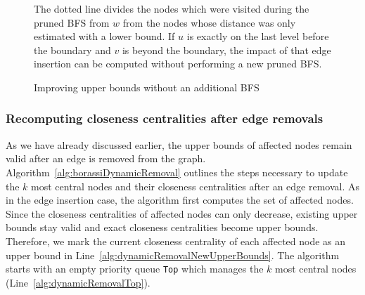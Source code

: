 \begin{figure}[h!]
\centering
{}
\caption{Improving upper bounds without an additional BFS}{The dotted line divides the nodes which were visited during the pruned BFS from $w$ from the nodes whose distance was only estimated with a lower bound. If $u$ is exactly on the last level before the boundary and $v$ is beyond the boundary, the impact of that edge insertion can be computed without performing a new pruned BFS.}
\label{fig:cheapBoundUpdate}
\end{figure}

\subsubsection{Recomputing closeness centralities after edge removals}
\label{sec:dynamicTopClosenessRemoval}
As we have already discussed earlier, the upper bounds of affected nodes remain valid after an edge is removed from the graph. Algorithm~\ref{alg:borassiDynamicRemoval} outlines the steps necessary to update the $k$ most central nodes and their closeness centralities after an edge removal. As in the edge insertion case, the algorithm first computes the set of affected nodes. Since the closeness centralities of affected nodes can only decrease, existing upper bounds stay valid and exact closeness centralities become upper bounds. Therefore, we mark the current closeness centrality of each affected node as an upper bound in Line~\ref{alg:dynamicRemovalNewUpperBounds}. The algorithm starts with an empty priority queue \texttt{Top} which manages the $k$ most central nodes  (Line~\ref{alg:dynamicRemovalTop}).

